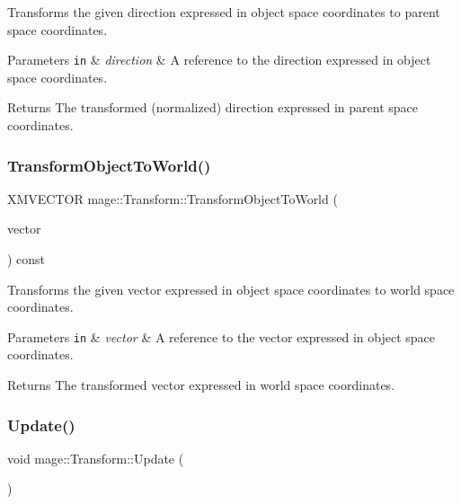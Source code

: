 Transforms the given direction expressed in object space coordinates to parent space coordinates.


\begin{DoxyParams}[1]{Parameters}
\mbox{\tt in}  & {\em direction} & A reference to the direction expressed in object space coordinates. \\
\hline
\end{DoxyParams}
\begin{DoxyReturn}{Returns}
The transformed (normalized) direction expressed in parent space coordinates. 
\end{DoxyReturn}
\hypertarget{structmage_1_1_transform_a3e5b476d0078f6bf243a7effa0f781fc}{}\label{structmage_1_1_transform_a3e5b476d0078f6bf243a7effa0f781fc} 
\subsubsection{\texorpdfstring{Transform\+Object\+To\+World()}{TransformObjectToWorld()}}
{\footnotesize\ttfamily X\+M\+V\+E\+C\+T\+OR mage\+::\+Transform\+::\+Transform\+Object\+To\+World (\begin{DoxyParamCaption}\item[{const X\+M\+V\+E\+C\+T\+OR \&}]{vector }\end{DoxyParamCaption}) const\hspace{0.3cm}{\ttfamily [private]}}

Transforms the given vector expressed in object space coordinates to world space coordinates.


\begin{DoxyParams}[1]{Parameters}
\mbox{\tt in}  & {\em vector} & A reference to the vector expressed in object space coordinates. \\
\hline
\end{DoxyParams}
\begin{DoxyReturn}{Returns}
The transformed vector expressed in world space coordinates. 
\end{DoxyReturn}
\hypertarget{structmage_1_1_transform_ab80fc4a9bd034540b1d30242c4d9ca90}{}\label{structmage_1_1_transform_ab80fc4a9bd034540b1d30242c4d9ca90} 
\subsubsection{\texorpdfstring{Update()}{Update()}}
{\footnotesize\ttfamily void mage\+::\+Transform\+::\+Update (\begin{DoxyParamCaption}{ }\end{DoxyParamCaption})\hspace{0.3cm}{\ttfamily [private]}}

